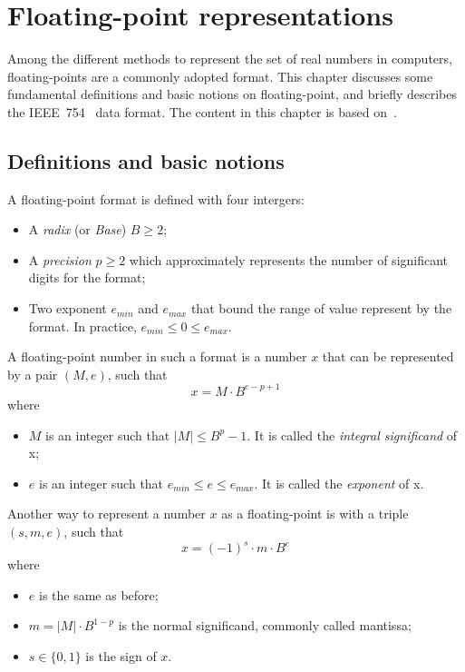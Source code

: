 \chapter{Floating-point representations}
\label{ch:background}
Among the different methods to represent the set of real numbers in computers,
floating-points are a commonly adopted format.
This chapter discusses some fundamental definitions and basic notions on floating-point,
and briefly describes the IEEE~754~\cite{ieee754_2008-ev} data format.
The content in this chapter is based on~\cite{Muller2018-zm}.

\section{Definitions and basic notions}
A floating-point format is defined with four intergers:
\begin{itemize}
	\item A \textit{radix} (or \textit{Base}) $B \ge 2$;
	\item A \textit{precision} $p \ge 2$ which approximately represents the number of significant digits for the format;
	\item Two exponent $e_{min}$ and $e_{max}$ that bound the range of value represent by the format. In practice, $e_{min} \le 0 \le e_{max}$.
\end{itemize}

A floating-point number in such a format is a number $x$ that can be represented by a pair $(M,e)$, such that
\begin{equation}
	x = M \cdot B^{e-p+1}
\end{equation}
where
\begin{itemize}
	\item $M$ is an integer such that $|M| \le B^{p}-1$. It is called the \textit{integral significand} of x;
	\item $e$ is an integer such that $e_{min} \le e \le e_{max}$. It is called the \textit{exponent} of x.
\end{itemize}

Another way to represent a number $x$ as a floating-point is with a triple $(s, m, e)$, such that
\begin{equation}
	x = (-1)^{s} \cdot m \cdot B^{e}
\end{equation}
where
\begin{itemize}
	\item $e$ is the same as before;
	\item $m = |M| \cdot B^{1-p}$ is the normal significand, commonly called mantissa;
	\item $s \in \{0, 1\}$ is the sign of $x$.
\end{itemize}


